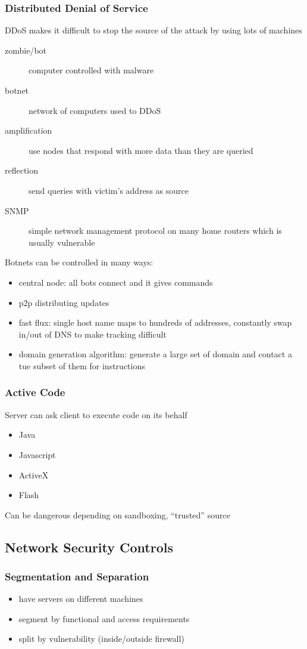 \documentclass[]{article}
\theoremstyle{definition}
\begin{document}
	\subsubsection{Distributed Denial of Service}
	DDoS makes it difficult to stop the source of the attack by using lots of machines
	\begin{description}
		\item[zombie/bot] computer controlled with malware
		\item[botnet] network of computers used to DDoS
		\item[amplification] use nodes that respond with more data than they are queried
		\item[reflection] send queries with victim's address as source
		\item[SNMP] simple network management protocol on many home routers which is usually vulnerable
	\end{description}
	Botnets can be controlled in many ways:
	\begin{itemize}
		\item central node: all bots connect and it gives commands
		\item p2p distributing updates
		\item fast flux: single host name maps to hundreds of addresses, constantly swap in/out of DNS to make tracking difficult
		\item domain generation algorithm: generate a large set of domain and contact a tue subset of them for instructions
	\end{itemize}

	\subsubsection{Active Code}
	Server can ask client to execute code on its behalf
	\begin{itemize}
		\item Java
		\item Javascript
		\item ActiveX
		\item Flash
	\end{itemize}
	Can be dangerous depending on sandboxing, ``trusted'' source

	\subsection{Network Security Controls}
	\subsubsection{Segmentation and Separation}
	\begin{itemize}
		\item have servers on different machines
		\item segment by functional and access requirements
		\item split by vulnerability (inside/outside firewall)
	\end{itemize}
\end{document}
